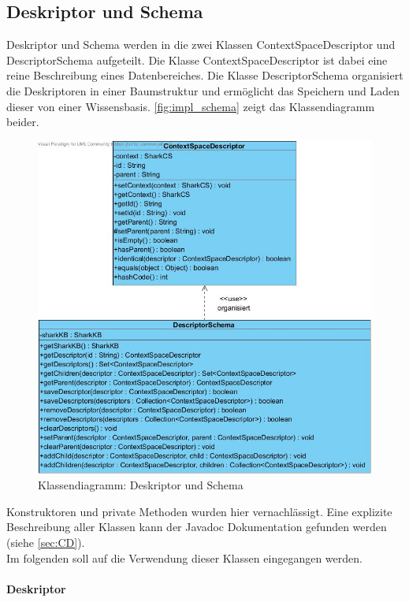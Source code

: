 \documentclass[a4paper]{article}
\begin{document}
	\subsection{Deskriptor und Schema}
	
	Deskriptor und Schema werden in die zwei Klassen ContextSpaceDescriptor
	und DescriptorSchema aufgeteilt. Die Klasse ContextSpaceDescriptor ist dabei
	eine reine Beschreibung eines Datenbereiches. Die Klasse DescriptorSchema
	organisiert die Deskriptoren in einer Baumstruktur und ermöglicht das
	Speichern und Laden dieser von einer Wissensbasis. \autoref{fig:impl_schema}
	zeigt das Klassendiagramm beider.
	
	\begin{figure}[H]
		\includegraphics[width=\linewidth]{../Bilder/impl_schema.jpg}
		\caption{Klassendiagramm: Deskriptor und Schema}
		\label{fig:impl_schema}
	\end{figure}	
	
	Konstruktoren und private Methoden wurden hier vernachlässigt. Eine
	explizite Beschreibung aller Klassen kann der Javadoc Dokumentation gefunden
	werden (siehe \autoref{sec:CD}). \\
	
	Im folgenden soll auf die Verwendung dieser Klassen eingegangen werden.
		
	\paragraph{Deskriptor}\mbox{} \\
	
\end{document}
